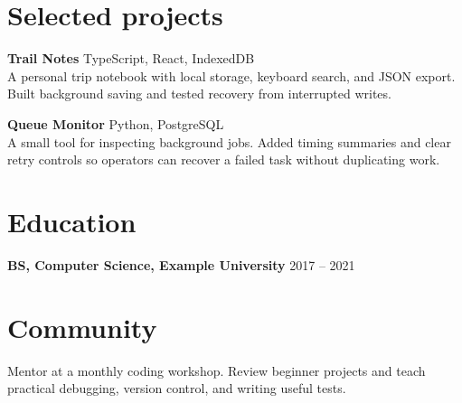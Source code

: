 \documentclass[10pt,a4paper]{article}
\begin{document}
\section{Selected projects}
\textbf{Trail Notes} \hfill TypeScript, React, IndexedDB\\
A personal trip notebook with local storage, keyboard search, and JSON export.
Built background saving and tested recovery from interrupted writes.

\textbf{Queue Monitor} \hfill Python, PostgreSQL\\
A small tool for inspecting background jobs. Added timing summaries and clear
retry controls so operators can recover a failed task without duplicating work.

\section{Education}
\textbf{BS, Computer Science, Example University} \hfill 2017 -- 2021

\section{Community}
Mentor at a monthly coding workshop. Review beginner projects and teach practical
debugging, version control, and writing useful tests.
\end{document}

